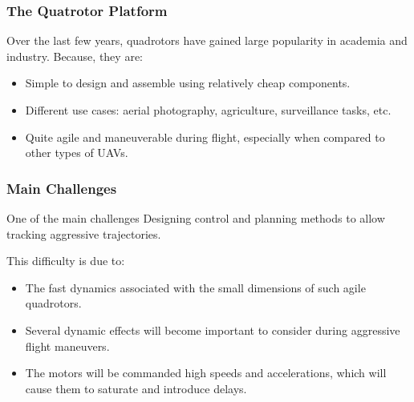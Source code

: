 \documentclass{thesisbeamer}
\newcommand\Fontvi{\fontsize{9}{10}\selectfont}
\begin{document}
\begin{frame}
\frametitle{The Quatrotor Platform}
\Fontvi

Over the last few years, quadrotors have gained large popularity in academia and industry. Because, they are:

\begin{itemize}
	\item Simple to design and assemble using relatively cheap components.
	\item Different use cases: aerial photography, agriculture, surveillance tasks, etc.
	\item Quite agile and maneuverable during flight, especially when compared to other types of UAVs.
\end{itemize}

\end{frame}

\begin{frame}
\frametitle{Main Challenges}
\Fontvi

\begin{block}{One of the main challenges}
	Designing control and planning methods to allow tracking aggressive trajectories.
\end{block}

This difficulty is due to: 
\begin{itemize}
	\item The fast dynamics associated with the small dimensions of such agile quadrotors.
	\item Several dynamic effects will become important to consider during aggressive flight maneuvers.
	\item The motors will be commanded high speeds and accelerations, which will cause them to saturate and introduce delays.
\end{itemize}


\end{frame}
\end{document}
